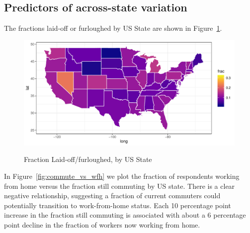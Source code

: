 \documentclass[12pt]{article}
\begin{document}
\subsection{Predictors of across-state variation} \label{sec:predictorsstate}
The fractions laid-off or furloughed by US State are shown in Figure~\ref{fig:geo_laidoff}.

\begin{figure}
  \caption{Fraction Laid-off/furloughed, by US State} \label{fig:geo_laidoff}
\centering
\begin{minipage}{1.0 \linewidth}
  \includegraphics[width = \linewidth]{plots/geo_laidoff.pdf} \\
  \begin{footnotesize}
    \end{footnotesize}
\end{minipage}
\end{figure} 

In Figure~\ref{fig:commute_vs_wfh} we plot the fraction of respondents working from home versus the fraction still commuting by US state.
There is a clear negative relationship, suggesting a fraction of current commuters could potentially transition to work-from-home status.
Each 10 percentage point increase in the fraction still commuting is associated with about a 6 percentage point decline in the fraction of workers now working from home. 
\end{document}

